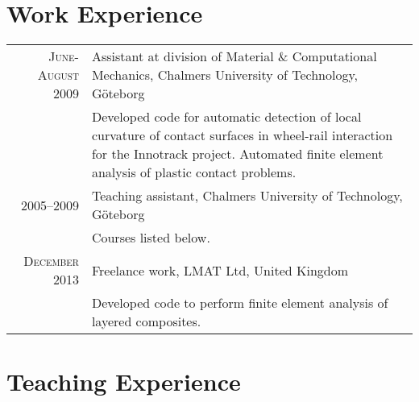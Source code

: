 \documentclass[a4paper,10pt]{article} %
\begin{document}

\section{Work Experience}

\begin{tabular}{r|p{11cm}}
\textsc{June-August 2009} & Assistant at division of Material \& Computational Mechanics, Chalmers University of Technology, Göteborg\\
& \footnotesize{Developed code for automatic detection of local curvature of contact surfaces in wheel-rail interaction for the Innotrack project. Automated finite element analysis of plastic contact problems.}\\

\textsc{2005--2009} & Teaching assistant, Chalmers University of Technology, Göteborg\\
& \footnotesize{Courses listed below.}\\

\textsc{December 2013} & Freelance work, LMAT Ltd, United Kingdom\\
& \footnotesize{Developed code to perform finite element analysis of layered composites.}\\

\end{tabular}


\section{Teaching Experience}
\end{document}
